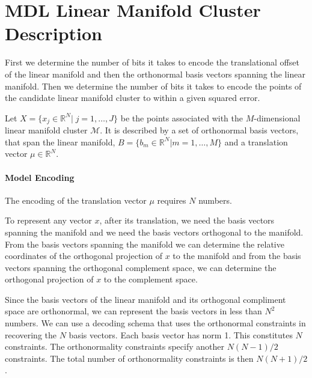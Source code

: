 \section{MDL Linear Manifold Cluster Description}
\label{sc:mdl-lmclus}
First we determine the number of bits it takes to encode the translational
offset of the linear manifold and then the orthonormal basis vectors
spanning the linear manifold. Then we determine the number of bits it takes
to encode the points of the candidate linear manifold cluster to
within a given squared error.

Let $X = \{x_j \in \mathbb{R}^N | \; j = 1, \dots, J \} $ be the points
associated with the $M$-dimensional linear manifold cluster $\mathcal{M}$.
It is described by a set of orthonormal basis vectors, that span the linear
manifold, $B = \{b_m \in \mathbb{R}^N | m = 1, \dots, M \}$ and
a translation vector $\mu \in \mathbb{R}^N$.

\paragraph{Model Encoding}
The encoding of the translation vector $\mu$ requires $N$ numbers.

To represent any vector $x$, after its translation, we need the basis vectors
spanning the manifold and we need the basis vectors orthogonal to the manifold.
From the basis vectors spanning the manifold we can determine the relative
coordinates of the orthogonal projection of $x$ to the manifold and from
the basis vectors spanning the orthogonal complement space, we can determine
the orthogonal projection of $x$ to the complement space.

Since the basis vectors of the linear manifold and its orthogonal compliment
space are orthonormal, we can represent the basis vectors in less than $N^2$
numbers. We can use a decoding schema that uses the orthonormal constraints in
recovering the $N$ basis vectors. Each basis vector has norm 1. This constitutes
$N$ constraints. The orthonormality constraints specify another $N(N-1)/2$
constraints. The total number of orthonormality constraints is then $N(N+1)/2$.

